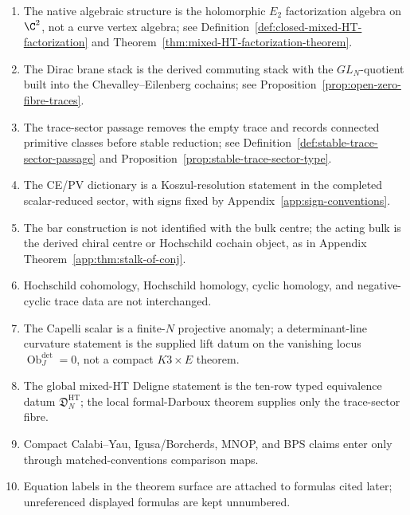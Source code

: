 \begin{enumerate}
\item The native algebraic structure is the holomorphic \(E_2\) factorization algebra on
  \(\C^2\), not a curve vertex algebra; see
  Definition~\ref{def:closed-mixed-HT-factorization} and
  Theorem~\ref{thm:mixed-HT-factorization-theorem}.
\item The Dirac brane stack is the derived commuting stack with the
  \(GL_N\)-quotient built into the Chevalley--Eilenberg cochains; see
  Proposition~\ref{prop:open-zero-fibre-traces}.
\item The trace-sector passage removes the empty trace and records
  connected primitive classes before stable reduction; see
  Definition~\ref{def:stable-trace-sector-passage} and
  Proposition~\ref{prop:stable-trace-sector-type}.
\item The CE/PV dictionary is a Koszul-resolution statement in the
  completed scalar-reduced sector, with signs fixed by
  Appendix~\ref{app:sign-conventions}.
\item The bar construction is not identified with the bulk centre; the
  acting bulk is the derived chiral centre or Hochschild cochain object,
  as in Appendix Theorem~\ref{app:thm:stalk-of-conj}.
\item Hochschild cohomology, Hochschild homology, cyclic homology, and
  negative-cyclic trace data are not interchanged.
\item The Capelli scalar is a finite-\(N\) projective anomaly; a
  determinant-line curvature statement is the supplied lift datum on
  the vanishing locus \(\operatorname{Ob}^{\det}_J=0\), not a compact
  \(K3\times E\) theorem.
\item The global mixed-HT Deligne statement is the ten-row typed
  equivalence datum \(\mathfrak D^{\mathrm{HT}}_N\); the local
  formal-Darboux theorem supplies only the trace-sector fibre.
\item Compact Calabi--Yau, Igusa/Borcherds, MNOP, and BPS claims enter
  only through matched-conventions comparison maps.
\item Equation labels in the theorem surface are attached to formulas
  cited later; unreferenced displayed formulas are kept unnumbered.
\end{enumerate}
